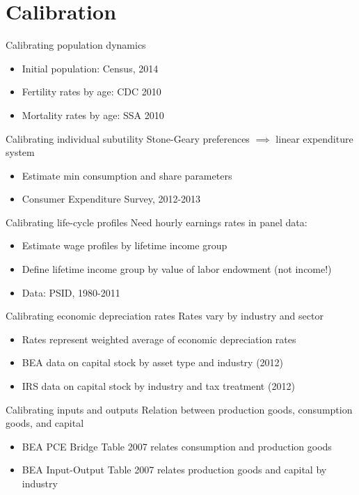 \documentclass{beamer}
\begin{document}
\section{Calibration}


\begin{frame}{Calibrating population dynamics}
\begin{itemize}
\item Initial population: Census, 2014
\item Fertility rates by age: CDC 2010
\item Mortality rates by age: SSA 2010
\end{itemize}
\end{frame}


\begin{frame}{Calibrating individual subutility}
Stone-Geary preferences $\implies$ linear expenditure system
\begin{itemize}
\item Estimate min consumption and share parameters
\item Consumer Expenditure Survey, 2012-2013
\end{itemize}
\end{frame}

\begin{frame}{Calibrating life-cycle profiles}
Need hourly earnings rates in panel data:
\begin{itemize}
\item Estimate wage profiles by lifetime income group
\item Define lifetime income group by value of labor endowment (not income!)
\item Data: PSID, 1980-2011
\end{itemize}
\end{frame}

\begin{frame}{Calibrating economic depreciation rates}
Rates vary by industry and sector
\begin{itemize}
\item Rates represent weighted average of economic depreciation rates
\item BEA data on capital stock by asset type and industry (2012)
\item IRS data on capital stock by industry and tax treatment (2012)
\end{itemize}
\end{frame}

\begin{frame}{Calibrating inputs and outputs}
Relation between production goods, consumption goods, and capital
\begin{itemize}
\item BEA PCE Bridge Table 2007 relates consumption and production goods
\item BEA Input-Output Table 2007 relates production goods and capital by industry
\end{itemize}
\end{frame}
\end{document}
